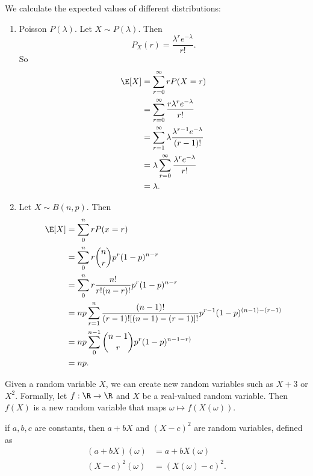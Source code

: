 \documentclass[a4paper]{article}
\begin{document}
\begin{eg}
  We calculate the expected values of different distributions:
  \begin{enumerate}
    \item Poisson $P(\lambda)$. Let $X\sim P(\lambda)$. Then
      \[
        P_X(r) = \frac{\lambda^r e^{-\lambda}}{r!}.
      \]
      So
      \begin{align*}
        \E[X] &= \sum_{r = 0}^\infty rP(X = r)\\
        &= \sum_{r = 0}^\infty \frac{r \lambda^r e^{-\lambda}}{r!}\\
        &= \sum_{r = 1}^\infty \lambda \frac{\lambda^{r - 1}e^{-\lambda}}{(r - 1)!}\\
        &= \lambda\sum_{r = 0}^\infty\frac{\lambda^r e^{-\lambda}}{r!}\\
        &= \lambda. 
      \end{align*}
    \item Let $X\sim B(n, p)$. Then
      \begin{align*}
        \E[X] &= \sum_0^n rP(x = r)\\
        &= \sum_0^n r\binom{n}{r} p^r(1 - p)^{n - r}\\
        &= \sum_0^n r\frac{n!}{r!(n - r)!}p^r (1 - p)^{n - r}\\
        &= np\sum_{r = 1}^n \frac{(n - 1)!}{(r - 1)![(n - 1) - (r - 1)]!}p^{r - 1}(1 - p)^{(n - 1) - (r - 1)}\\
        &= np\sum_{0}^{n - 1}\binom{n - 1}{r}p^r(1 - p)^{n - 1 - r)}\\
        &= np.
      \end{align*}
  \end{enumerate}
\end{eg}
Given a random variable $X$, we can create new random variables such as $X + 3$ or $X^2$. Formally, let $f: \R \to \R$ and $X$ be a real-valued random variable. Then $f(X)$ is a new random variable that maps $\omega \mapsto f(X(\omega))$.

\begin{eg}
  if $a, b, c$ are constants, then $a + bX$ and $(X - c)^2$ are random variables, defined as
  \begin{align*}
    (a + bX)(\omega) &= a + bX(\omega)\\
    (X - c)^2(\omega) &= (X(\omega) - c)^2.
  \end{align*}
\end{eg}
\end{document}

